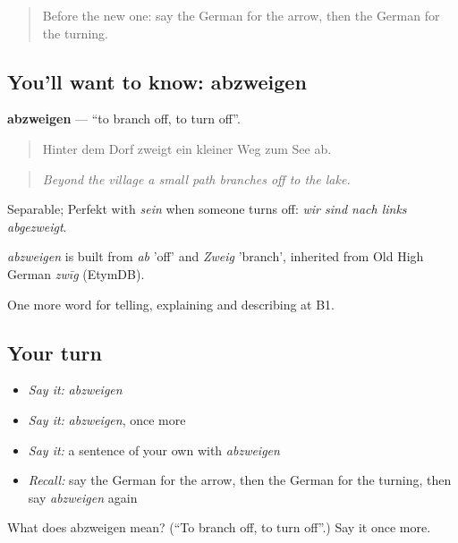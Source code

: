 \label{lesson:GE-C434-abzweigen}



\begin{quote}
Before the new one: say the German for the arrow, then the German for the turning.
\end{quote}

\subsection*{You'll want to know: abzweigen}
\textbf{abzweigen} — \textquotedblleft{}to branch off, to turn off\textquotedblright{}.

\begin{quote}
Hinter dem Dorf zweigt ein kleiner Weg zum See ab.
\end{quote}

\begin{quote}
\emph{Beyond the village a small path branches off to the lake.}
\end{quote}

Separable; Perfekt with \emph{sein} when someone turns off: \emph{wir sind nach links abgezweigt}.

\begin{cousinweb}
\emph{abzweigen} is built from \emph{ab} 'off' and \emph{Zweig} 'branch', inherited from Old High German \emph{zwīg} (EtymDB).
\end{cousinweb}

\begin{grammarlens}[title={What you've built}]
One more word for telling, explaining and describing at B1.
\end{grammarlens}

\subsection*{Your turn}
\begin{itemize}
\raggedright
  \item \emph{Say it:} \emph{abzweigen}
  \item \emph{Say it:} \emph{abzweigen}, once more
  \item \emph{Say it:} a sentence of your own with \emph{abzweigen}
  \item \emph{Recall:} say the German for the arrow, then the German for the turning, then say \emph{abzweigen} again
\end{itemize}

\begin{tcolorbox}[breakable,colback=teal!4,colframe=teal!35!black,title={Before you move on}]
What does abzweigen mean? (\textquotedblleft{}To branch off, to turn off\textquotedblright{}.) Say it once more.
\end{tcolorbox}
